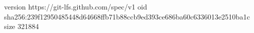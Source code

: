 version https://git-lfs.github.com/spec/v1
oid sha256:239f12950485448d64668ffb71b88ccb9ed393ce686ba60c6336013e2510ba1c
size 321884
